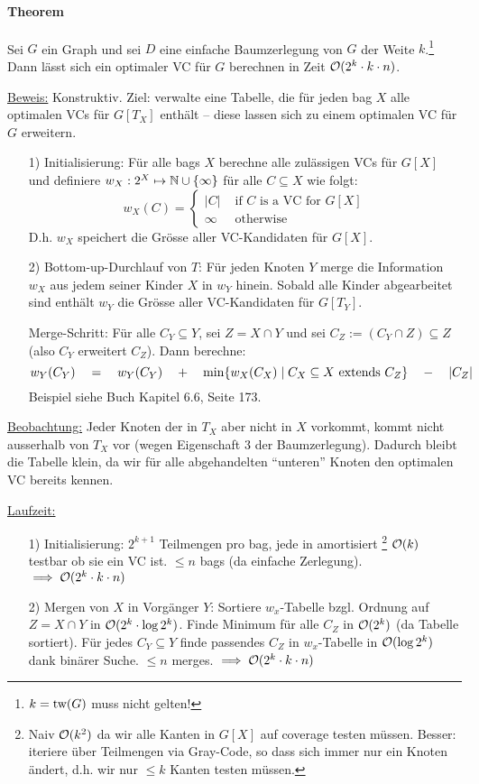 \paragraph{Theorem}
Sei $G$ ein Graph und sei $D$ eine einfache Baumzerlegung von $G$ der Weite $k$.\footnote{$k = \text{tw}(G)$ muss nicht gelten!}
Dann lässt sich ein optimaler VC für $G$ berechnen in Zeit $\mathcal{O} (2^k \cdot k \cdot n)$.

\underline{Beweis:} Konstruktiv.
Ziel: verwalte eine Tabelle, die für jeden bag $X$ alle optimalen VCs für $G[T_X]$ enthält -- diese lassen sich
zu einem optimalen VC für $G$ erweitern.
\begin{itemize}
    \item[1)] Initialisierung:
    Für alle bags $X$ berechne alle zulässigen VCs für $G[X]$
    und definiere $w_X : 2^X \mapsto \mathbb{N} \cup \{\infty\}$ für alle $C \subseteq X$ wie folgt:
    $$ w_X (C) = \begin{cases}
    |C| & \text{ if $C$ is a VC for $G[X]$} \\
    \infty & \text{ otherwise}
    \end{cases}$$
    D.h. $w_X$ speichert die Grösse aller VC-Kandidaten für $G[X]$.
    \item[2)] Bottom-up-Durchlauf von $T$:
    Für jeden Knoten $Y$ merge die Information $w_X$ aus jedem seiner Kinder $X$ in $w_Y$ hinein.
    Sobald alle Kinder abgearbeitet sind enthält $w_Y$ die Grösse aller VC-Kandidaten für $G[T_Y]$.

    Merge-Schritt:
    Für alle $C_Y \subseteq Y$, sei $Z = X \cap Y$ und sei $C_Z := (C_Y \cap Z) \subseteq Z$
    (also $C_Y$ erweitert $C_Z$). Dann berechne:
    $$
    w_Y (C_Y) \quad = \quad w_Y (C_Y)
    \quad + \quad \min \{ w_X (C_X) \; | \; C_X \subseteq X \text{ extends } C_Z \} \quad - \quad |C_Z|
    $$
    Beispiel siehe Buch Kapitel 6.6, Seite 173.
\end{itemize}

\underline{Beobachtung:} Jeder Knoten der in $T_X$ aber nicht in $X$ vorkommt, kommt nicht ausserhalb von $T_X$ vor
(wegen Eigenschaft 3 der Baumzerlegung).
Dadurch bleibt die Tabelle klein, da wir für alle abgehandelten ``unteren'' Knoten den optimalen VC bereits kennen.

\underline{Laufzeit:}
\begin{itemize}
    \item[1)] Initialisierung: $2^{k+1}$ Teilmengen pro bag, jede in amortisiert%
    \footnote{Naiv $\mathcal{O} (k^2)$ da wir alle Kanten in $G[X]$ auf coverage testen müssen.
    Besser: iteriere über Teilmengen via Gray-Code, so dass sich immer nur ein Knoten ändert,
    d.h. wir nur $\leq k$ Kanten testen müssen.}
    $\mathcal{O} (k)$ testbar ob sie ein VC ist.
    $\leq n$ bags (da einfache Zerlegung).
    $\implies \mathcal{O} (2^k \cdot k \cdot n)$
    \item[2)] Mergen von $X$ in Vorgänger $Y$:
    Sortiere $w_x$-Tabelle bzgl. Ordnung auf $Z=X \cap Y$ in $\mathcal{O} (2^k \cdot \log 2^k)$.
    Finde Minimum für alle $C_Z$ in $\mathcal{O}(2^k)$ (da Tabelle sortiert).
    Für jedes $C_Y \subseteq Y$ finde passendes $C_Z$ in $w_x$-Tabelle in $\mathcal{O}(\log 2^k)$ dank binärer Suche.
    $\leq n$ merges.
    $\implies \mathcal{O} (2^k \cdot k \cdot n)$
\end{itemize}


